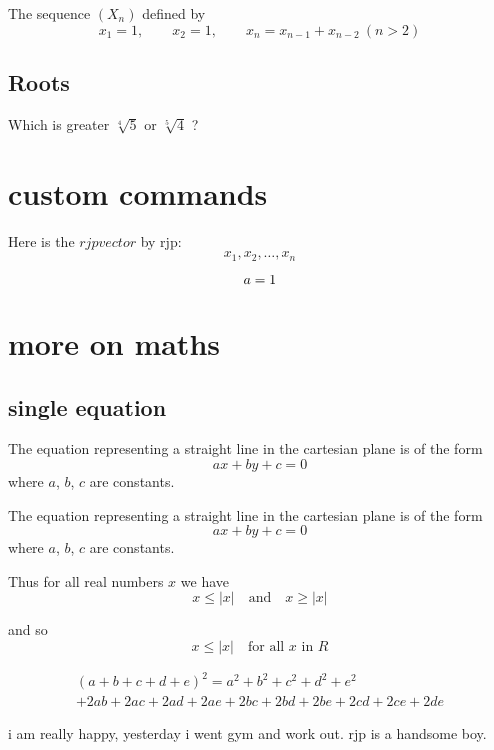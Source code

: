 \documentclass[a4paper, UTF8]{article}
\newcommand{\rjpvector}[2]{#1_1,#1_2,\dots,#1_#2}
\begin{document}
The sequence $(X_n)$ defined by
$$
x_1=1,\qquad x_2=1, \qquad x_n=x_{n-1}+x_{n-2}\: (n>2)
$$

\newpage
\subsection{\large Roots}
Which is greater $\sqrt[4]{5}$ or $\sqrt[5]{4}$ ?

\section{\Large custom commands}
Here is the $rjpvector$ by rjp:
$$
\rjpvector{x}{n}
$$

\begin{equation}
    a=1
    \numberwithin{equation}{section}
\end{equation}

\section{\Large more on maths}
\subsection{\large single equation}
The equation representing a straight line in the cartesian plane is of the form
\begin{equation*}
    ax+by+c=0
\end{equation*}
where $a$, $b$, $c$ are constants.

The equation representing a straight line in the cartesian plane is of the form
\begin{equation}
    ax+by+c=0
\end{equation}
where $a$, $b$, $c$ are constants.

Thus for all real numbers $x$ we have
\begin{equation*}
    x\le|x|\quad\text{and}\quad x\ge|x|
\end{equation*}

and so
\begin{equation*}
    x\le|x|\quad\text{for all $x$ in $R$}    
\end{equation*}

\begin{multline*}
    (a+b+c+d+e)^2=a^2+b^2+c^2+d^2+e^2\\
    +2ab+2ac+2ad+2ae+2bc+2bd+2be+2cd+2ce+2de
\end{multline*}

i am really happy, yesterday i went gym and work out. rjp is a handsome boy.
\end{document}
